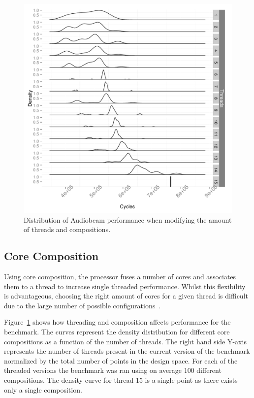 \begin{figure}[t]
  \includegraphics[width=1\textwidth]{streamit-paper/graphics/audiobeam_tots.pdf}
  \caption{Distribution of Audiobeam performance when modifying the amount of threads and compositions.}\label{fig:audiototal}
\end{figure}

\subsection{Core Composition}

Using core composition, the processor fuses a number of cores and associates them to a thread to increase single threaded performance.
Whilst this flexibility is advantageous, choosing the right amount of cores for a given thread is difficult due to the large number of possible configurations~\cite{gulati2008multitaskingdmc}.

Figure~\ref{fig:audiototal} shows how threading and composition affects performance for the  benchmark.
The curves represent the density distribution for different core compositions as a function of the number of threads.
The right hand side Y-axis represents the number of threads present in the current version of the benchmark normalized by the total number of points in the design space.
For each of the threaded versions the benchmark was ran using on average 100 different compositions.
The density curve for thread 15 is a single point as there exists only a single composition.

